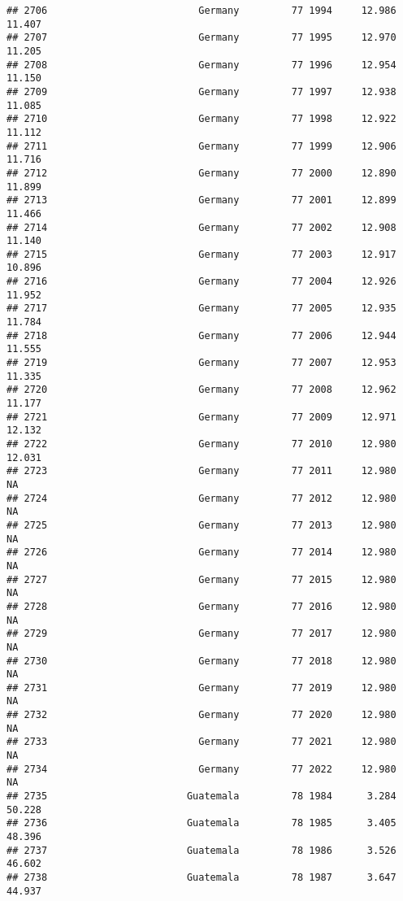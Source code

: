 \documentclass[
]{article}
\begin{document}
\begin{verbatim}
## 2706                          Germany         77 1994     12.986     11.407
## 2707                          Germany         77 1995     12.970     11.205
## 2708                          Germany         77 1996     12.954     11.150
## 2709                          Germany         77 1997     12.938     11.085
## 2710                          Germany         77 1998     12.922     11.112
## 2711                          Germany         77 1999     12.906     11.716
## 2712                          Germany         77 2000     12.890     11.899
## 2713                          Germany         77 2001     12.899     11.466
## 2714                          Germany         77 2002     12.908     11.140
## 2715                          Germany         77 2003     12.917     10.896
## 2716                          Germany         77 2004     12.926     11.952
## 2717                          Germany         77 2005     12.935     11.784
## 2718                          Germany         77 2006     12.944     11.555
## 2719                          Germany         77 2007     12.953     11.335
## 2720                          Germany         77 2008     12.962     11.177
## 2721                          Germany         77 2009     12.971     12.132
## 2722                          Germany         77 2010     12.980     12.031
## 2723                          Germany         77 2011     12.980         NA
## 2724                          Germany         77 2012     12.980         NA
## 2725                          Germany         77 2013     12.980         NA
## 2726                          Germany         77 2014     12.980         NA
## 2727                          Germany         77 2015     12.980         NA
## 2728                          Germany         77 2016     12.980         NA
## 2729                          Germany         77 2017     12.980         NA
## 2730                          Germany         77 2018     12.980         NA
## 2731                          Germany         77 2019     12.980         NA
## 2732                          Germany         77 2020     12.980         NA
## 2733                          Germany         77 2021     12.980         NA
## 2734                          Germany         77 2022     12.980         NA
## 2735                        Guatemala         78 1984      3.284     50.228
## 2736                        Guatemala         78 1985      3.405     48.396
## 2737                        Guatemala         78 1986      3.526     46.602
## 2738                        Guatemala         78 1987      3.647     44.937

\end{verbatim}
\end{document}
